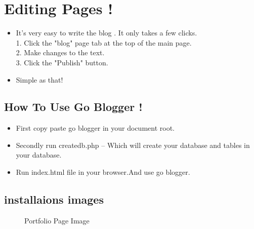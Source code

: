 \documentclass{article}
\begin{document}
\section{\bf Editing Pages !}
\begin{itemize}
\item It's very easy to write the blog . It only takes a few clicks.\\
1. Click the "blog" page tab at the top of the main page.\\
2. Make changes to the text.\\
3. Click the "Publish" button.\\

\item Simple as that! 
\end{itemize}

\subsection{\bf How To Use Go Blogger !}
\begin{itemize}
\item First copy paste go blogger in your document root.
 \item Secondly run createdb.php -- Which will create your database and tables in your database.
\item  Run index.html file in your browser.And use go blogger.
\end{itemize}
\subsection{\bf installaions images}

\begin{figure}[h]
 \scalebox{0.2}{\texttt{[image: ]}}
  \caption{Portfolio Page Image}
\end{figure}
\end{document}
